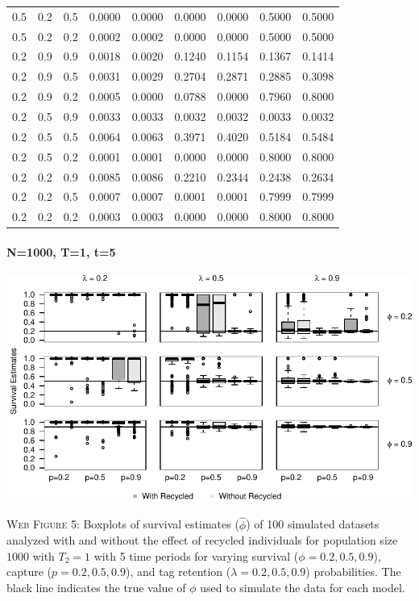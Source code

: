 \documentclass[]{article}
\let\oldparagraph\paragraph
\renewcommand{\paragraph}[1]{\oldparagraph{#1}\mbox{}}
\begin{document}
\begin{table}[ht]
{\begin{tabular}{rrrrrrrrr}
  0.5 & 0.2 & 0.5 & 0.0000 & 0.0000 & 0.0000 & 0.0000 & 0.5000 & 0.5000 \\ 
  0.5 & 0.2 & 0.2 & 0.0002 & 0.0002 & 0.0000 & 0.0000 & 0.5000 & 0.5000 \\ 
  0.2 & 0.9 & 0.9 & 0.0018 & 0.0020 & 0.1240 & 0.1154 & 0.1367 & 0.1414 \\ 
  0.2 & 0.9 & 0.5 & 0.0031 & 0.0029 & 0.2704 & 0.2871 & 0.2885 & 0.3098 \\ 
  0.2 & 0.9 & 0.2 & 0.0005 & 0.0000 & 0.0788 & 0.0000 & 0.7960 & 0.8000 \\ 
  0.2 & 0.5 & 0.9 & 0.0033 & 0.0033 & 0.0032 & 0.0032 & 0.0033 & 0.0032 \\ 
  0.2 & 0.5 & 0.5 & 0.0064 & 0.0063 & 0.3971 & 0.4020 & 0.5184 & 0.5484 \\ 
  0.2 & 0.5 & 0.2 & 0.0001 & 0.0001 & 0.0000 & 0.0000 & 0.8000 & 0.8000 \\ 
  0.2 & 0.2 & 0.9 & 0.0085 & 0.0086 & 0.2210 & 0.2344 & 0.2438 & 0.2634 \\ 
  0.2 & 0.2 & 0.5 & 0.0007 & 0.0007 & 0.0001 & 0.0001 & 0.7999 & 0.7999 \\ 
  0.2 & 0.2 & 0.2 & 0.0003 & 0.0003 & 0.0000 & 0.0000 & 0.8000 & 0.8000 \\ 
   \hline
\end{tabular}
}
\endgroup
\end{table}

\newpage

\paragraph{N=1000, T=1, t=5}\label{n1000-t1-t5}

\includegraphics{Appendix_BW_files/figure-latex/figure5_survival_GJSTL5-1.pdf}

\textsc{Web Figure 5:} Boxplots of survival estimates (\(\hat{\phi}\))
of 100 simulated datasets analyzed with and without the effect of
recycled individuals for population size \(1000\) with \(T_2=1\) with 5
time periods for varying survival (\(\phi=0.2,0.5,0.9\)), capture
(\(p=0.2,0.5,0.9\)), and tag retention (\(\lambda=0.2,0.5,0.9\))
probabilities. The black line indicates the true value of \(\phi\) used
to simulate the data for each model.
\end{document}
